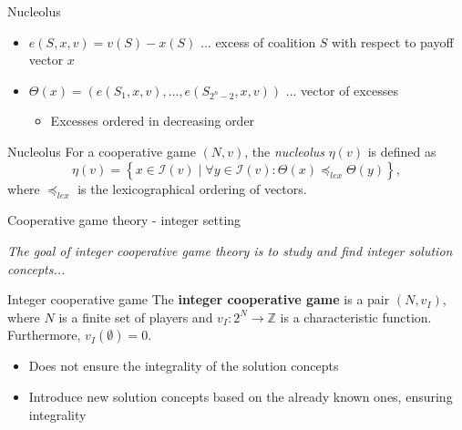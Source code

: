 \documentclass{beamer}
\newcommand{\Z}{\mathbb{Z}}
\begin{document}
\begin{frame}{Nucleolus}

    \begin{itemize}
        \item $e(S,x,v) = v(S) - x(S)$ ... excess of coalition $S$ with respect to payoff vector $x$
        \item $\Theta(x)=\left(e(S_1,x,v), \dots, e(S_{2^{n}-2},x,v)\right)$ ... vector of excesses
        \begin{itemize}
            \item Excesses ordered in decreasing order
        \end{itemize}
    \end{itemize}


    \begin{block}{Nucleolus}
        For a cooperative game $(N,v)$, the \emph{nucleolus} $\eta(v)$ is defined as
        \begin{displaymath}
            \eta(v) = \left\{ x \in \mathcal{I}(v) \mid \forall y \in \mathcal{I}(v): \Theta(x) \preceq_{lex} \Theta(y)\right\},
        \end{displaymath}
        where $\preceq_{lex}$ is the lexicographical ordering of vectors.
    \end{block}
\end{frame}



\begin{frame}{Cooperative game theory - integer setting}

    \textit{The goal of integer cooperative game theory is to study and find integer solution concepts...}


    \begin{block}{Integer cooperative game}
        The \textbf{integer cooperative game} is a pair $(N, v_I)$, where $N$ is a finite set of players and $v_I: 2^N \to \Z$ is a characteristic function.
        Furthermore, $v_I(\emptyset) = 0$.
    \end{block}


    \begin{itemize}
        \item Does not ensure the integrality of the solution concepts
        \item Introduce new solution concepts based on the already known ones, ensuring integrality
    \end{itemize}

\end{frame}
\end{document}
